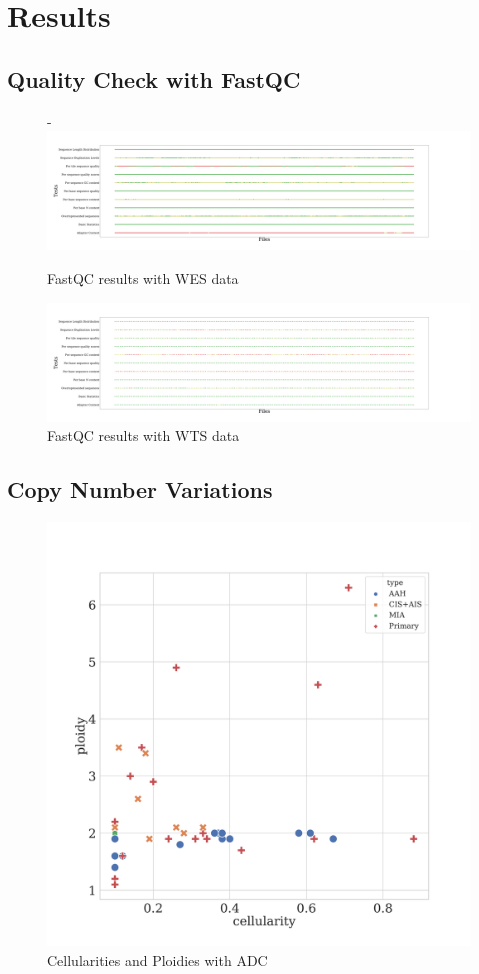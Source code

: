 \documentclass[a4paper]{article}
\begin{document}
    \section{Results}
        \subsection{Quality Check with FastQC}

            \begin{figure}[htbp]
                \centering-
               \includegraphics[width=0.8 \linewidth]{figures/FastQC/FastQC_WES.pdf}
                \caption{FastQC results  with WES data}
                \label{fig:fastqc-WES}
            \end{figure}

            \begin{figure}[htbp]
                \centering
                \includegraphics[width=0.8 \linewidth]{figures/FastQC/FastQC_WTS.pdf}
                \caption{FastQC results with WTS data}
                \label{fig:fastqc-WTS}
            \end{figure}

        \subsection{Copy Number Variations}

            \begin{figure}[htbp]
                \centering
                \includegraphics[width=0.6 \linewidth]{figures/Sequenza/BWA-sequenza-ADC.pdf}
                \caption{Cellularities and Ploidies with ADC}
                \label{fig:sequenza-ADC}
            \end{figure}
\end{document}
